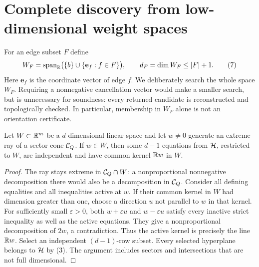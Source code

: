 \section{Complete discovery from low-dimensional weight spaces}
\label{sec:flat-search}

For an edge subset $F$ define
\[
       W_F=\operatorname{span}_{\mathbb R}\bigl(\{b\}\cup\{\mathbf e_f:f\in F\}\bigr),
       \qquad d_F=\dim W_F\le |F|+1.                     \tag{7}\label{eq:WF}
\]
Here $\mathbf e_f$ is the coordinate vector of edge $f$. We deliberately
search the whole space $W_F$. Requiring a nonnegative cancellation vector
would make a smaller search, but is unnecessary for soundness: every
returned candidate is reconstructed and topologically checked. In
particular, membership in $W_F$ alone is not an orientation certificate.

\begin{lemma}
\label{lem:active}
Let $W\subset\mathbb R^m$ be a $d$-dimensional linear space and let $w\ne0$
generate an extreme ray of a sector cone $\mathcal C_Q$. If $w\in W$, then some
$d-1$ equations from $\mathcal H$, restricted to $W$, are independent and have
common kernel $\mathbb R w$ in $W$.
\end{lemma}
\begin{proof}
The ray stays extreme in $\mathcal C_Q\cap W$: a nonproportional nonnegative
decomposition there would also be a decomposition in $\mathcal C_Q$.
Consider all defining equalities and all inequalities active at $w$.
If their common kernel in $W$ had dimension greater than one, choose a
direction $u$ not parallel to $w$ in that kernel. For sufficiently small
$\varepsilon>0$, both $w+\varepsilon u$ and $w-\varepsilon u$ satisfy
every inactive strict inequality as well as the active equations. They
give a nonproportional decomposition of $2w$, a contradiction. Thus the
active kernel is precisely the line $\mathbb R w$. Select an independent
$(d-1)$-row subset. Every selected hyperplane belongs to $\mathcal H$ by (3).
The argument includes sectors and intersections that are not full
dimensional.
\end{proof}

